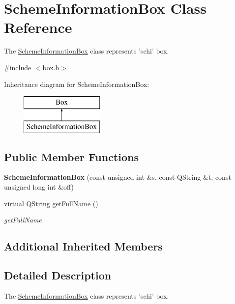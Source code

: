 \hypertarget{class_scheme_information_box}{\section{Scheme\-Information\-Box Class Reference}
\label{class_scheme_information_box}
}


The \hyperlink{class_scheme_information_box}{Scheme\-Information\-Box} class represents 'schi' box.  




{\ttfamily \#include $<$box.\-h$>$}

Inheritance diagram for Scheme\-Information\-Box\-:\begin{figure}[H]
\begin{center}
\leavevmode
\includegraphics[height=2.000000cm]{class_scheme_information_box}
\end{center}
\end{figure}
\subsection*{Public Member Functions}
\begin{DoxyCompactItemize}
\item 
\hypertarget{class_scheme_information_box_a283e39c555df3fcc4db2aeb15ff44e41}{{\bfseries Scheme\-Information\-Box} (const unsigned int \&s, const Q\-String \&t, const unsigned long int \&off)}\label{class_scheme_information_box_a283e39c555df3fcc4db2aeb15ff44e41}

\item 
virtual Q\-String \hyperlink{class_scheme_information_box_ac23d413584b8c7efe0693f42e8b05bcb}{get\-Full\-Name} ()
\begin{DoxyCompactList}\small\item\em get\-Full\-Name \end{DoxyCompactList}\end{DoxyCompactItemize}
\subsection*{Additional Inherited Members}


\subsection{Detailed Description}
The \hyperlink{class_scheme_information_box}{Scheme\-Information\-Box} class represents 'schi' box. 


